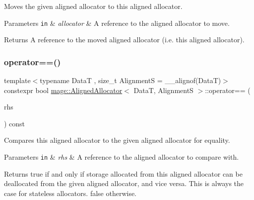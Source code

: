 Moves the given aligned allocator to this aligned allocator.


\begin{DoxyParams}[1]{Parameters}
\mbox{\tt in}  & {\em allocator} & A reference to the aligned allocator to move. \\
\hline
\end{DoxyParams}
\begin{DoxyReturn}{Returns}
A reference to the moved aligned allocator (i.\+e. this aligned allocator). 
\end{DoxyReturn}
\hypertarget{structmage_1_1_aligned_allocator_a965e61e026392438052824c70ddd7d81}{}\label{structmage_1_1_aligned_allocator_a965e61e026392438052824c70ddd7d81} 
\subsubsection{\texorpdfstring{operator==()}{operator==()}}
{\footnotesize\ttfamily template$<$typename DataT , size\+\_\+t AlignmentS = \+\_\+\+\_\+alignof(\+Data\+T)$>$ \\
constexpr bool \hyperlink{structmage_1_1_aligned_allocator}{mage\+::\+Aligned\+Allocator}$<$ DataT, AlignmentS $>$\+::operator== (\begin{DoxyParamCaption}\item[{const \hyperlink{structmage_1_1_aligned_allocator}{Aligned\+Allocator}$<$ DataT, AlignmentS $>$ \&}]{rhs }\end{DoxyParamCaption}) const\hspace{0.3cm}{\ttfamily [noexcept]}}

Compares this aligned allocator to the given aligned allocator for equality.


\begin{DoxyParams}[1]{Parameters}
\mbox{\tt in}  & {\em rhs} & A reference to the aligned allocator to compare with. \\
\hline
\end{DoxyParams}
\begin{DoxyReturn}{Returns}
{\ttfamily true} if and only if storage allocated from this aligned allocator can be deallocated from the given aligned allocator, and vice versa. This is always the case for stateless allocators. {\ttfamily false} otherwise. 
\end{DoxyReturn}
